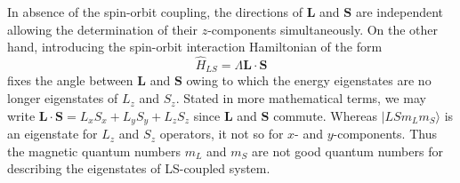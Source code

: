In absence of the spin-orbit coupling, the directions of $\mathbf{L}$ and $\mathbf{S}$ are independent allowing the determination of their $z$-components  simultaneously. On the other hand, introducing the spin-orbit interaction Hamiltonian of the form
\begin{equation}
\hat{H}_{LS} = \Lambda \mathbf{L}\cdot\mathbf{S}
\end{equation}
fixes the angle between $\mathbf{L}$ and $\mathbf{S}$ owing to which the energy eigenstates are no longer eigenstates of $L_z$ and $S_z$. Stated in more mathematical terms, we may write $\mathbf{L} \cdot \mathbf{S} = L_x S_x + L_y S_y + L_z S_z$ since $\mathbf{L}$ and $\mathbf{S}$ commute. Whereas $|LSm_Lm_S\rangle$ is an eigenstate for $L_z$ and $S_z$ operators, it not so for $x$- and $y$-components. Thus the magnetic quantum numbers $m_L$ and $m_S$ are not good quantum numbers for describing the eigenstates of LS-coupled system.





